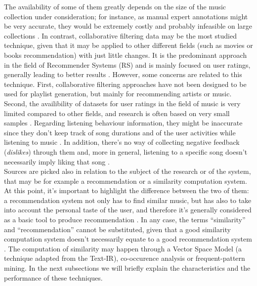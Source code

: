  The availability of some of them greatly depends on the size of the music collection under consideration; for instance, as manual expert annotations might be very accurate, they would be extremely costly and probably infeasible on large collections \cite{Szyma09}. In contrast, collaborative filtering data may be the most studied technique, given that it may be applied to other different fields (such as movies or books recommendation) with just little changes. It is the predominant approach in the field of Recommender Systems (RS) \cite{jannach12} and is mainly focused on user ratings, generally leading to better results \cite{green09}. However, some concerns are related to this technique. First, collaborative filtering approaches have not been designed to be used for playlist generation, but mainly for recommending artists or music. Second, the availibility of datasets for user ratings in the field of music is very limited compared to other fields, and research is often based on very small samples \cite{liu09}. Regarding listening behaviour information, they might be inaccurate  since they don't keep track of song durations and of the user activities while listening to music \cite{jawaheer10}. In addition, there's no way of collecting negative feedback (\textit{dislikes}) through them and, more in general, listening to a specific song doesn't necessarily imply liking that song \cite{bogdanov13}. \\Sources are picked also in relation to the subject of the research or of the system, that may be for example a recommendation or a similarity computation system. At this point, it's important to highlight the difference between the two of them: a recommendation system not only has to find similar music, but has also to take into account the personal taste of the user, and therefore it's generally considered as a basic tool to produce recommendation \cite{celma08}. In any case, the terms ``similarity'' and ``recommendation'' cannot be substituted, given that a good similarity computation system doesn't necessarily equate to a good recommendation system \cite{mcnee06}. 
 The computation of similarity may happen through a Vector Space Model (a technique adapted from the Text-IR), co-occurence analysis or frequent-pattern mining. In the next subsections we will briefly explain the characteristics and the performance of these techniques.

